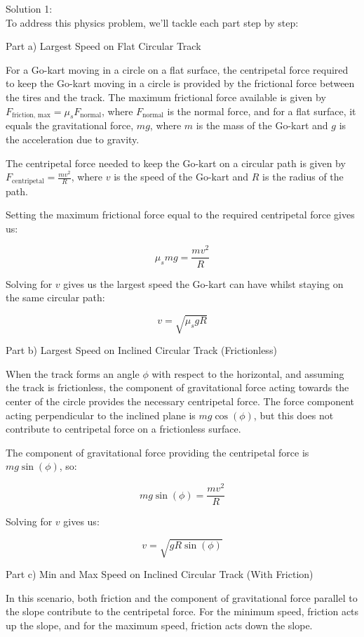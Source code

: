 \documentclass[a4paper,11pt]{article}
\begin{document}
\bigskip

\noindent Solution 1: \\

To address this physics problem, we'll tackle each part step by step:

Part a) Largest Speed on Flat Circular Track

For a Go-kart moving in a circle on a flat surface, the centripetal force required to keep the Go-kart moving in a circle is provided by the frictional force between the tires and the track. The maximum frictional force available is given by \( F_{\text{friction, max}} = \mu_s F_{\text{normal}} \), where \( F_{\text{normal}} \) is the normal force, and for a flat surface, it equals the gravitational force, \( mg \), where \( m \) is the mass of the Go-kart and \( g \) is the acceleration due to gravity.

The centripetal force needed to keep the Go-kart on a circular path is given by \( F_{\text{centripetal}} = \frac{mv^2}{R} \), where \( v \) is the speed of the Go-kart and \( R \) is the radius of the path.

Setting the maximum frictional force equal to the required centripetal force gives us:

\[ \mu_s mg = \frac{mv^2}{R} \]

Solving for \( v \) gives us the largest speed the Go-kart can have whilst staying on the same circular path:

\[ v = \sqrt{\mu_s g R} \]

Part b) Largest Speed on Inclined Circular Track (Frictionless)

When the track forms an angle \( \phi \) with respect to the horizontal, and assuming the track is frictionless, the component of gravitational force acting towards the center of the circle provides the necessary centripetal force. The force component acting perpendicular to the inclined plane is \( mg\cos(\phi) \), but this does not contribute to centripetal force on a frictionless surface.

The component of gravitational force providing the centripetal force is \( mg\sin(\phi) \), so:

\[ mg\sin(\phi) = \frac{mv^2}{R} \]

Solving for \( v \) gives us:

\[ v = \sqrt{gR\sin(\phi)} \]

Part c) Min and Max Speed on Inclined Circular Track (With Friction)

In this scenario, both friction and the component of gravitational force parallel to the slope contribute to the centripetal force. For the minimum speed, friction acts up the slope, and for the maximum speed, friction acts down the slope.
\end{document}
